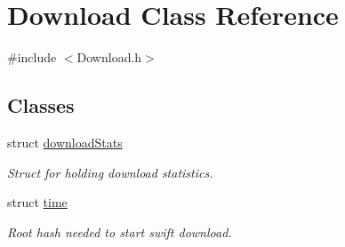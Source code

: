 \hypertarget{classDownload}{
\section{Download Class Reference}
\label{classDownload}
}


{\ttfamily \#include $<$Download.h$>$}

\subsection*{Classes}
\begin{DoxyCompactItemize}
\item 
struct \hyperlink{structDownload_1_1downloadStats}{downloadStats}
\begin{DoxyCompactList}\small\item\em Struct for holding download statistics. \end{DoxyCompactList}\item 
struct \hyperlink{structDownload_1_1time}{time}
\begin{DoxyCompactList}\small\item\em Root hash needed to start swift download. \end{DoxyCompactList}\end{DoxyCompactItemize}

